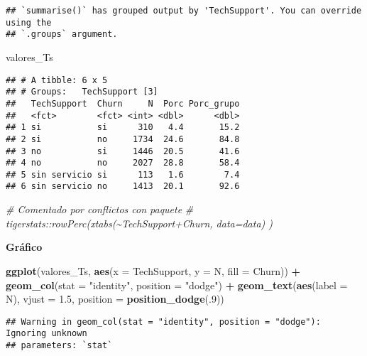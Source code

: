 \documentclass[
]{article}
\newenvironment{Shaded}{\begin{snugshade}}{\end{snugshade}}
\newcommand{\AttributeTok}[1]{\textcolor[rgb]{0.13,0.29,0.53}{#1}}
\newcommand{\CommentTok}[1]{\textcolor[rgb]{0.56,0.35,0.01}{\textit{#1}}}
\newcommand{\DecValTok}[1]{\textcolor[rgb]{0.00,0.00,0.81}{#1}}
\newcommand{\FloatTok}[1]{\textcolor[rgb]{0.00,0.00,0.81}{#1}}
\newcommand{\FunctionTok}[1]{\textcolor[rgb]{0.13,0.29,0.53}{\textbf{#1}}}
\newcommand{\NormalTok}[1]{#1}
\newcommand{\SpecialCharTok}[1]{\textcolor[rgb]{0.81,0.36,0.00}{\textbf{#1}}}
\newcommand{\StringTok}[1]{\textcolor[rgb]{0.31,0.60,0.02}{#1}}
\begin{document}
\begin{verbatim}
## `summarise()` has grouped output by 'TechSupport'. You can override using the
## `.groups` argument.
\end{verbatim}

\begin{Shaded}
\begin{Highlighting}[]
\NormalTok{valores\_Ts}
\end{Highlighting}
\end{Shaded}

\begin{verbatim}
## # A tibble: 6 x 5
## # Groups:   TechSupport [3]
##   TechSupport  Churn     N  Porc Porc_grupo
##   <fct>        <fct> <int> <dbl>      <dbl>
## 1 si           si      310   4.4       15.2
## 2 si           no     1734  24.6       84.8
## 3 no           si     1446  20.5       41.6
## 4 no           no     2027  28.8       58.4
## 5 sin servicio si      113   1.6        7.4
## 6 sin servicio no     1413  20.1       92.6
\end{verbatim}

\begin{Shaded}
\begin{Highlighting}[]
\CommentTok{\# Comentado por conflictos con paquete}
\CommentTok{\# tigerstats::rowPerc(xtabs(\textasciitilde{}TechSupport+Churn, data=data) )}
\end{Highlighting}
\end{Shaded}

\textbf{Gráfico}

\begin{Shaded}
\begin{Highlighting}[]
\FunctionTok{ggplot}\NormalTok{(valores\_Ts, }\FunctionTok{aes}\NormalTok{(}\AttributeTok{x =}\NormalTok{ TechSupport, }\AttributeTok{y =}\NormalTok{ N, }\AttributeTok{fill =}\NormalTok{ Churn)) }\SpecialCharTok{+}
  \FunctionTok{geom\_col}\NormalTok{(}\AttributeTok{stat =} \StringTok{"identity"}\NormalTok{, }\AttributeTok{position =} \StringTok{"dodge"}\NormalTok{) }\SpecialCharTok{+}
  \FunctionTok{geom\_text}\NormalTok{(}\FunctionTok{aes}\NormalTok{(}\AttributeTok{label =}\NormalTok{ N), }\AttributeTok{vjust =} \FloatTok{1.5}\NormalTok{,}
            \AttributeTok{position =} \FunctionTok{position\_dodge}\NormalTok{(.}\DecValTok{9}\NormalTok{))}
\end{Highlighting}
\end{Shaded}

\begin{verbatim}
## Warning in geom_col(stat = "identity", position = "dodge"): Ignoring unknown
## parameters: `stat`
\end{verbatim}
\end{document}
